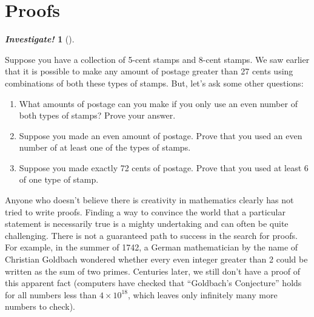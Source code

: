 \documentclass[10pt,]{book}
\theoremstyle{plain}
\theoremstyle{definition}
\theoremstyle{definition}
\newtheorem{investigation}[project]{\emph{Investigate!}}
\theoremstyle{definition}
\numberwithin{equation}{chapter}
\begin{document}
\section[Proofs]{Proofs}\label{sec_proofs}
\typeout{************************************************}
\typeout{************************************************}
\begin{investigation}[]\label{investigation-27}

Suppose you have a collection of 5-cent stamps and 8-cent stamps. We saw earlier that it is possible to make any amount of postage greater than 27 cents using combinations of both these types of stamps. But, let's ask some other questions:
\leavevmode%
\begin{enumerate}
\item\hypertarget{li-1079}{}
What amounts of postage can you make if you only use an even number of both types of stamps? Prove your answer.
%
\item\hypertarget{li-1080}{}
Suppose you made an even amount of postage. Prove that you used an even number of at least one of the types of stamps.
%
\item\hypertarget{li-1081}{}
Suppose you made exactly 72 cents of postage. Prove that you used at least 6 of one type of stamp.
%
\end{enumerate}
%
\end{investigation}

Anyone who doesn't believe there is creativity in mathematics clearly has not tried to write proofs. Finding a way to convince the world that a particular statement is necessarily true is a mighty undertaking and can often be quite challenging. There is not a guaranteed path to success in the search for proofs. For example, in the summer of 1742, a German mathematician by the name of Christian Goldbach wondered whether every even integer greater than 2 could be written as the sum of two primes. Centuries later, we still don't have a proof of this apparent fact (computers have checked that ``Goldbach's Conjecture'' holds for all numbers less than \(4\times 10^{18}\), which leaves only infinitely many more numbers to check).
%
\par
\end{document}
